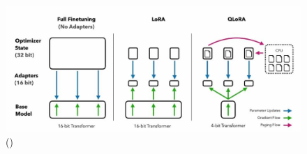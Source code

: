 \begin{figure}[H]
    \begin{center}
      \includegraphics[width=13cm]{figuras/Capitulo_09/QLoRa.jpg}
    \end{center}
    \caption[]{(\cite{DettmersTim2023QEFo})}
    \label{fig:qlora}
\end{figure}\


